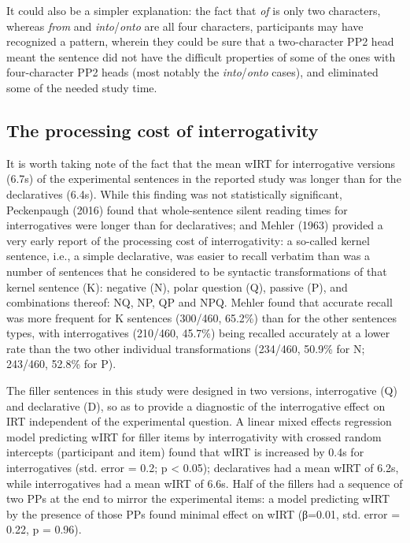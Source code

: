 \documentclass[12pt,oneside]{book}
\begin{document}
It could also be a simpler explanation: the fact that \emph{of} is only two characters, whereas \emph{from} and \emph{into}/\emph{onto} are all four characters, participants may have recognized a pattern, wherein they could be sure that a two-character PP2 head meant the sentence did not have the difficult properties of some of the ones with four-character PP2 heads (most notably the \emph{into}/\emph{onto} cases), and eliminated some of the needed study time.

\hypertarget{qslow}{%
\subsection{The processing cost of interrogativity}\label{qslow}}

It is worth taking note of the fact that the mean wIRT for interrogative versions (6.7s) of the experimental sentences in the reported study was longer than for the declaratives (6.4s). While this finding was not statistically significant, Peckenpaugh (2016) found that whole-sentence silent reading times for interrogatives were longer than for declaratives; and Mehler (1963) provided a very early report of the processing cost of interrogativity: a so-called kernel sentence, i.e., a simple declarative, was easier to recall verbatim than was a number of sentences that he considered to be syntactic transformations of that kernel sentence (K): negative (N), polar question (Q), passive (P), and combinations thereof: NQ, NP, QP and NPQ. Mehler found that accurate recall was more frequent for K sentences (300/460, 65.2\%) than for the other sentences types, with interrogatives (210/460, 45.7\%) being recalled accurately at a lower rate than the two other individual transformations (234/460, 50.9\% for N; 243/460, 52.8\% for P).

The filler sentences in this study were designed in two versions, interrogative (Q) and declarative (D), so as to provide a diagnostic of the interrogative effect on IRT independent of the experimental question. A linear mixed effects regression model predicting wIRT for filler items by interrogativity with crossed random intercepts (participant and item) found that wIRT is increased by 0.4s for interrogatives (std. error = 0.2; p \textless{} 0.05); declaratives had a mean wIRT of 6.2s, while interrogatives had a mean wIRT of 6.6s. Half of the fillers had a sequence of two PPs at the end to mirror the experimental items: a model predicting wIRT by the presence of those PPs found minimal effect on wIRT (β=0.01, std. error = 0.22, p = 0.96).
\end{document}
